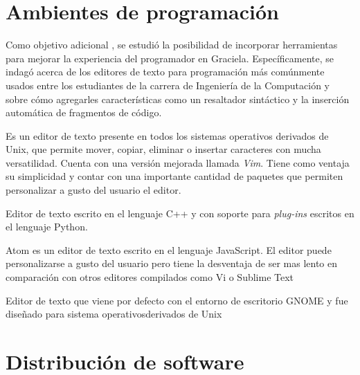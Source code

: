 \section{Ambientes de programación}

Como objetivo adicional , se estudió la posibilidad de
incorporar herramientas para mejorar la experiencia del programador en Graciela.
Específicamente, se indagó acerca de los editores de texto para programación más
comúnmente usados entre los estudiantes de la carrera de Ingeniería de la
Computación y sobre cómo agregarles características como un resaltador
sintáctico y la inserción automática de fragmentos de código.

\begin{enumerate}[label=\emph{}]
   Es un editor de texto presente en todos los sistemas operativos derivados de
  Unix, que  permite mover, copiar, eliminar o insertar caracteres con mucha
  versatilidad. Cuenta con una versión mejorada llamada \textit{Vim}. Tiene como
  ventaja su simplicidad y contar con una importante cantidad de paquetes que
  permiten personalizar a gusto del usuario el editor.
  
   Editor de texto escrito en el lenguaje C++ y con soporte 
  para \textit{plug-ins} escritos en el lenguaje Python.
  
   Atom es un editor de texto escrito en el lenguaje JavaScript. El editor puede
  personalizarse a gusto del usuario pero tiene la desventaja de ser mas lento
  en comparación con otros editores compilados como Vi o Sublime Text

  Editor de texto que viene por defecto con el entorno de escritorio GNOME y fue
  diseñado para sistema operativosderivados de Unix
\end{enumerate}




\section{Distribución de software}

